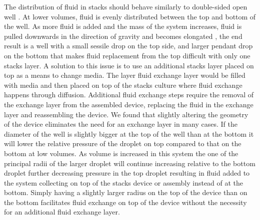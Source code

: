 The distribution of fluid in stacks should behave similarly to double-sided open well \cite{DeGroot2016}. At lower volumes, fluid is evenly distributed between the top and bottom of the well. As more fluid is added and the mass of the system increases, fluid is pulled downwards in the direction of gravity and becomes elongated \cite{Carvajal2011}, the end result is a well with a small sessile drop on the top side, and larger pendant drop on the bottom that makes fluid replacement from the top difficult with only one stacks layer. A solution to this issue is to use an additional stacks layer placed on top as a means to change media. The layer fluid exchange layer would be filled with media and then placed on top of the stacks culture where fluid exchange happens through diffusion. Additional fluid exchange steps require the removal of the exchange layer from the assembled device, replacing the fluid in the exchange layer and reassembling the device. We found that slightly altering the geometry of the device eliminates the need for an exchange layer in many cases. If the diameter of the well is slightly bigger at the top of the well than at the bottom it will lower the relative pressure of the droplet on top compared to that on the bottom at low volumes. As volume is increased in this system the one of the principal radii of the larger droplet will continue increasing relative to the bottom droplet further decreasing pressure in the top droplet resulting in fluid added to the system collecting on top of the stacks device or assembly instead of at the bottom. Simply having a slightly larger radius on the top of the device than on the bottom facilitates fluid exchange on top of the device without the necessity for an additional fluid exchange layer.